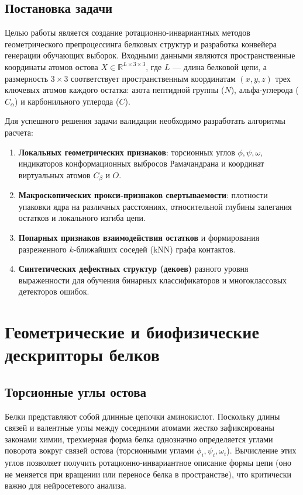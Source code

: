 \documentclass[12pt, a4paper]{article}
\begin{document}
\subsection{Постановка задачи}
Целью работы является создание ротационно-инвариантных методов геометрического препроцессинга белковых структур и разработка конвейера генерации обучающих выборок.
Входными данными являются пространственные координаты атомов остова $X \in \mathbb{R}^{L \times 3 \times 3}$, где $L$ — длина белковой цепи, а размерность $3 \times 3$ соответствует пространственным координатам $(x, y, z)$ трех ключевых атомов каждого остатка: азота пептидной группы ($N$), альфа-углерода ($C_\alpha$) и карбонильного углерода ($C$).

Для успешного решения задачи валидации необходимо разработать алгоритмы расчета:
\begin{enumerate}
    \item \textbf{Локальных геометрических признаков}: торсионных углов $\phi, \psi, \omega$, индикаторов конформационных выбросов Рамачандрана и координат виртуальных атомов $C_\beta$ и $O$.
    \item \textbf{Макроскопических прокси-признаков свертываемости}: плотности упаковки ядра на различных расстояниях, относительной глубины залегания остатков и локального изгиба цепи.
    \item \textbf{Попарных признаков взаимодействия остатков} и формирования разреженного $k$-ближайших соседей (kNN) графа контактов.
    \item \textbf{Синтетических дефектных структур (декоев)} разного уровня выраженности для обучения бинарных классификаторов и многоклассовых детекторов ошибок.
\end{enumerate}

\newpage

\section{Геометрические и биофизические дескрипторы белков}

\subsection{Торсионные углы остова}
Белки представляют собой длинные цепочки аминокислот. Поскольку длины связей и валентные углы между соседними атомами жестко зафиксированы законами химии, трехмерная форма белка однозначно определяется углами поворота вокруг связей остова (торсионными углами $\phi_i, \psi_i, \omega_i$). Вычисление этих углов позволяет получить ротационно-инвариантное описание формы цепи (оно не меняется при вращении или переносе белка в пространстве), что критически важно для нейросетевого анализа.
\end{document}
